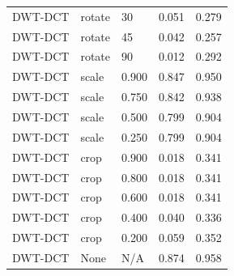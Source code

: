 \begin{table}
\begin{tabular}{lllrr}
DWT-DCT & rotate & 30 & 0.051 & 0.279 \\
DWT-DCT & rotate & 45 & 0.042 & 0.257 \\
DWT-DCT & rotate & 90 & 0.012 & 0.292 \\
DWT-DCT & scale & 0.900 & 0.847 & 0.950 \\
DWT-DCT & scale & 0.750 & 0.842 & 0.938 \\
DWT-DCT & scale & 0.500 & 0.799 & 0.904 \\
DWT-DCT & scale & 0.250 & 0.799 & 0.904 \\
DWT-DCT & crop & 0.900 & 0.018 & 0.341 \\
DWT-DCT & crop & 0.800 & 0.018 & 0.341 \\
DWT-DCT & crop & 0.600 & 0.018 & 0.341 \\
DWT-DCT & crop & 0.400 & 0.040 & 0.336 \\
DWT-DCT & crop & 0.200 & 0.059 & 0.352 \\
DWT-DCT & None & N/A & 0.874 & 0.958 \\
\bottomrule
\end{tabular}
\end{table}
